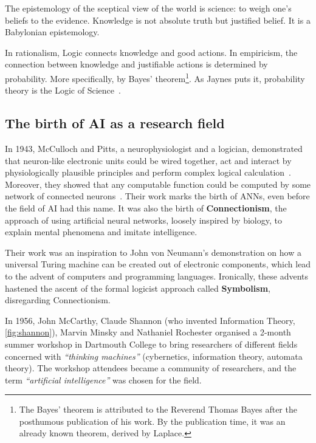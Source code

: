The epistemology of the sceptical view of the world is science: to weigh one's beliefs to the evidence. Knowledge is not absolute truth but justified belief. It is a Babylonian epistemology.

In rationalism, Logic connects knowledge and good actions. In empiricism, the connection between knowledge and justifiable actions is determined by probability. More specifically, by Bayes' theorem\footnote{The Bayes' theorem is attributed to the Reverend Thomas Bayes after the posthumous publication of his work. By the publication time, it was an already known theorem, derived by Laplace.}. As Jaynes puts it, probability theory is the Logic of Science~.
\subsection{The birth of AI as a research field}

In 1943, McCulloch and Pitts, a neurophysiologist and a logician, demonstrated that neuron-like electronic units could be wired together, act and interact by physiologically plausible principles and perform complex logical calculation~\cite{russell:2010}. Moreover, they showed that any computable function could be computed by some network of connected neurons~\cite{mcculloch:1943}. Their work marks the birth of \acfp{ANN}, even before the field of AI had this name. It was also the birth of \textbf{Connectionism}, the approach of using artificial neural networks, loosely inspired by biology, to explain mental phenomena and imitate intelligence.

Their work was an inspiration to John von Neumann's demonstration on how a universal Turing machine can be created out of electronic components, which lead to the advent of computers and programming languages. Ironically, these advents hastened the ascent of the formal logicist approach called \textbf{Symbolism}, disregarding Connectionism.

In 1956, John McCarthy, Claude Shannon (who invented Information Theory, \cref{fig:shannon}), Marvin Minsky and Nathaniel Rochester organised a 2-month summer workshop in Dartmouth College to bring researchers of different fields concerned with \emph{``thinking machines''} (cybernetics, information theory, automata theory). The workshop attendees became a community of researchers, and the term \emph{``artificial intelligence''} was chosen for the field.
